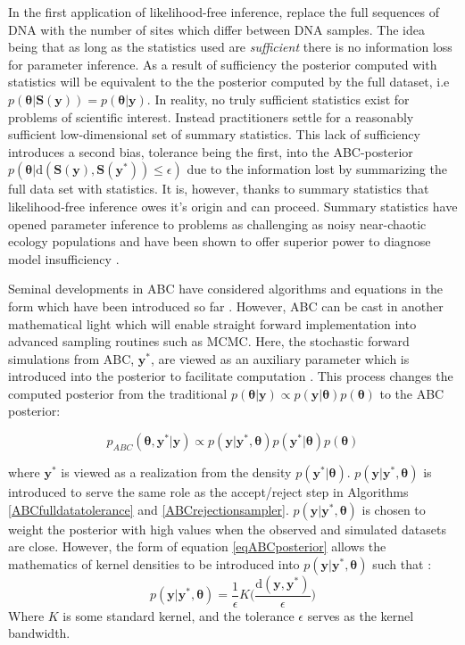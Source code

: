 In the first application of likelihood-free inference, \citet{Tavare1997} replace the full sequences of DNA with the number of sites which differ between DNA samples. The idea being that as long as the statistics used are \textit{sufficient} there is no information loss for parameter inference. As a result of sufficiency the posterior computed with statistics will be equivalent to the the posterior computed by the full dataset, i.e $p(\bm{\theta}|\bm{S}(\bm{y})) = p(\bm{\theta}|\bm{y})$. In reality, no truly sufficient statistics exist for problems of scientific interest. Instead practitioners settle for a reasonably sufficient low-dimensional set of summary statistics. This lack of sufficiency introduces a second bias, tolerance being the first, into the ABC-posterior $p(\bm{\theta}|\text{d}(\bm{S}(\bm{y}),\bm{S}(\bm{y^*}))\leq\epsilon)$ due to the information lost by summarizing the full data set with statistics. It is, however, thanks to summary statistics that likelihood-free inference owes it's origin and can proceed. Summary statistics have opened parameter inference to problems as challenging as noisy near-chaotic ecology populations \citep{Wood2010} and have been shown to offer superior power to diagnose model insufficiency \citep{Ratmann2009,vrugt2013toward}.\par

Seminal developments in ABC have considered algorithms and equations in the form which have been introduced so far \citep{Fu1997,Pritchard1999a,Beaumont2002,Marjoram2003}. However, ABC can be cast in another mathematical light which will enable straight forward implementation into advanced sampling routines such as MCMC. Here, the stochastic forward simulations from ABC, $\bm{y^*}$, are viewed as an auxiliary parameter which is introduced into the posterior to facilitate computation \citep{Sisson2010a}. This process changes the computed posterior from the traditional $p(\bm{\theta}|\bm{y}) \propto p(\bm{y}|\bm{\theta})p(\bm{\theta})$ to the ABC posterior:

\begin{equation}
p_{ABC}(\bm{\theta},\bm{y^*}|\bm{y}) \propto p(\bm{y}|\bm{y^*},\bm{\theta}) p(\bm{y^*}|\bm{\theta}) p(\bm{\theta})
\label{eqABCposterior}
\end{equation}

where $\bm{y^*}$ is viewed as a realization from the density $p(\bm{y^*}|\bm{\theta})$. $p(\bm{y}|\bm{y^*},\bm{\theta})$ is introduced to serve the same role as the accept/reject step in Algorithms \ref{ABCfulldatatolerance} and \ref{ABCrejectionsampler}. $p(\bm{y}|\bm{y^*},\bm{\theta})$ is chosen to weight the posterior with high values when the observed and simulated datasets are close. However, the form of equation \ref{eqABCposterior} allows the mathematics of kernel densities to be introduced into $p(\bm{y}|\bm{y^*},\bm{\theta})$ such that \citep{Sisson2010a}:
\begin{equation}
p(\bm{y}|\bm{y^*},\bm{\theta}) = \frac{1}{\epsilon} K \Big(\frac{\text{d}(\bm{y},\bm{y^*})}{\epsilon}\Big)
\label{generic-weighting-kernel}
\end{equation}
Where $K$ is some standard kernel, and the tolerance $\epsilon$ serves as the kernel bandwidth. \par

